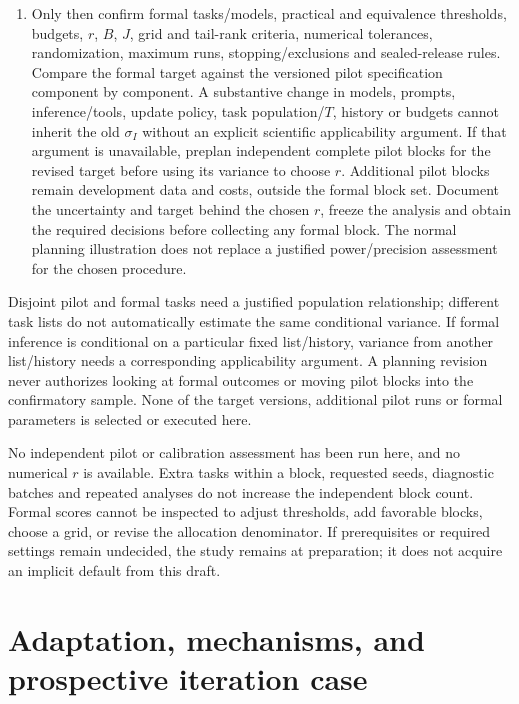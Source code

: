 \documentclass[
  english,
  11pt,
]{article}
\begin{document}
\begin{enumerate}
  guarantee. If applicability or calibration remains unsupported, formal
  inference remains unready.
\item
  Only then confirm formal tasks/models, practical and equivalence
  thresholds, budgets, \(r\), \(B\), \(J\), grid and tail-rank criteria,
  numerical tolerances, randomization, maximum runs, stopping/exclusions
  and sealed-release rules. Compare the formal target against the
  versioned pilot specification component by component. A substantive
  change in models, prompts, inference/tools, update policy, task
  population/\(T\), history or budgets cannot inherit the old
  \(\sigma_I\) without an explicit scientific applicability argument. If
  that argument is unavailable, preplan independent complete pilot
  blocks for the revised target before using its variance to choose
  \(r\). Additional pilot blocks remain development data and costs,
  outside the formal block set. Document the uncertainty and target
  behind the chosen \(r\), freeze the analysis and obtain the required
  decisions before collecting any formal block. The normal planning
  illustration does not replace a justified power/precision assessment
  for the chosen procedure.
\end{enumerate}

Disjoint pilot and formal tasks need a justified population
relationship; different task lists do not automatically estimate the
same conditional variance. If formal inference is conditional on a
particular fixed list/history, variance from another list/history needs
a corresponding applicability argument. A planning revision never
authorizes looking at formal outcomes or moving pilot blocks into the
confirmatory sample. None of the target versions, additional pilot runs
or formal parameters is selected or executed here.

No independent pilot or calibration assessment has been run here, and no
numerical \(r\) is available. Extra tasks within a block, requested
seeds, diagnostic batches and repeated analyses do not increase the
independent block count. Formal scores cannot be inspected to adjust
thresholds, add favorable blocks, choose a grid, or revise the
allocation denominator. If prerequisites or required settings remain
undecided, the study remains at preparation; it does not acquire an
implicit default from this draft.

\section{Adaptation, mechanisms, and prospective iteration
case}\label{adaptation-mechanisms-and-prospective-iteration-case}
\end{document}
